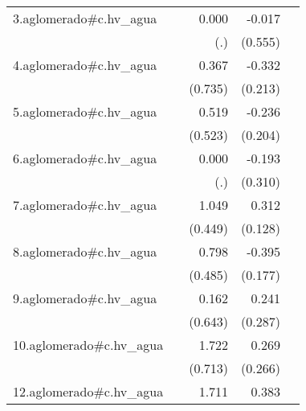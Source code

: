 {\begin{longtable}{l*{4}{D{.}{.}{-1}}}
\addlinespace
3.aglomerado#c.hv\_agua&                     &       0.000         &      -0.017         &                     \\
            &                     &         (.)         &     (0.555)         &                     \\
\addlinespace
4.aglomerado#c.hv\_agua&                     &       0.367         &      -0.332         &                     \\
            &                     &     (0.735)         &     (0.213)         &                     \\
\addlinespace
5.aglomerado#c.hv\_agua&                     &       0.519         &      -0.236         &                     \\
            &                     &     (0.523)         &     (0.204)         &                     \\
\addlinespace
6.aglomerado#c.hv\_agua&                     &       0.000         &      -0.193         &                     \\
            &                     &         (.)         &     (0.310)         &                     \\
\addlinespace
7.aglomerado#c.hv\_agua&                     &       1.049\sym{*}  &       0.312\sym{*}  &                     \\
            &                     &     (0.449)         &     (0.128)         &                     \\
\addlinespace
8.aglomerado#c.hv\_agua&                     &       0.798         &      -0.395\sym{*}  &                     \\
            &                     &     (0.485)         &     (0.177)         &                     \\
\addlinespace
9.aglomerado#c.hv\_agua&                     &       0.162         &       0.241         &                     \\
            &                     &     (0.643)         &     (0.287)         &                     \\
\addlinespace
10.aglomerado#c.hv\_agua&                     &       1.722\sym{*}  &       0.269         &                     \\
            &                     &     (0.713)         &     (0.266)         &                     \\
\addlinespace
12.aglomerado#c.hv\_agua&                     &       1.711\sym{*}  &       0.383         &                     \\

\end{longtable}}

